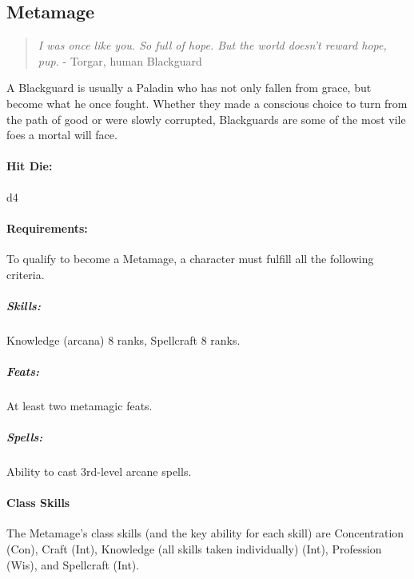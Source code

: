 \subsection{Metamage}
\begin{quote}
\emph{I was once like you. So full of hope. But the world doesn't reward hope, pup.}
- Torgar, human Blackguard
\end{quote}
A Blackguard is usually a Paladin who has not only fallen from grace, but become what he once fought. Whether they made a conscious choice to turn from the path of good or were slowly corrupted, Blackguards are some of the most vile foes a mortal will face.
\paragraph{Hit Die:} d4\\
\paragraph{Requirements:}
To qualify to become a Metamage, a character must fulfill all the following criteria.

\subparagraph{Skills:} 
Knowledge (arcana) 8 ranks, Spellcraft 8 ranks.
\subparagraph{Feats:} 
At least two metamagic feats.
\subparagraph{Spells:}
Ability to cast 3rd-level arcane spells.

\paragraph{Class Skills}

The Metamage's class skills (and the key ability for each skill) are Concentration (Con), Craft (Int), Knowledge (all skills taken individually) (Int), Profession (Wis), and Spellcraft (Int). 

